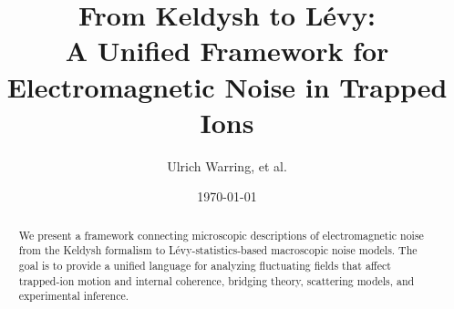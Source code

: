 \documentclass[11pt,a4paper]{article}
\title{From Keldysh to L\'evy:\\
  A Unified Framework for Electromagnetic Noise in Trapped Ions}
\author[1]{Ulrich Warring, et al.}
\affil[1]{Physikalisches Institut, Universität Freiburg, Germany}
\date{\today}
\begin{document}
\maketitle

\begin{abstract}
We present a framework connecting microscopic descriptions of electromagnetic noise
from the Keldysh formalism to L\'evy-statistics-based macroscopic noise models.
The goal is to provide a unified language for analyzing fluctuating fields
that affect trapped-ion motion and internal coherence,
bridging theory, scattering models, and experimental inference.
\end{abstract}















\end{document}
